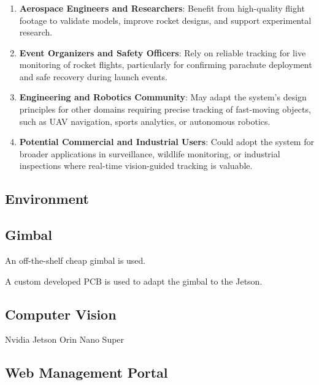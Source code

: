 \documentclass{article}
\begin{document}
\subsubsection*{\color{blue}{Indirect Stakeholders}}
\begin{enumerate}
    \item \textbf{Aerospace Engineers and Researchers}: Benefit from high-quality flight footage to validate models, improve rocket designs, and support experimental research.  

    \item \textbf{Event Organizers and Safety Officers}: Rely on reliable tracking for live monitoring of rocket flights, particularly for confirming parachute deployment and safe recovery during launch events.  

    \item \textbf{Engineering and Robotics Community}: May adapt the system’s design principles for other domains requiring precise tracking of fast-moving objects, such as UAV navigation, sports analytics, or autonomous robotics.  

    \item \textbf{Potential Commercial and Industrial Users}: Could adopt the system for broader applications in surveillance, wildlife monitoring, or industrial inspections where real-time vision-guided tracking is valuable.  
\end{enumerate}


\subsection{Environment}


\subsection{Gimbal}

An off-the-shelf cheap gimbal is used.

A custom developed PCB is used to adapt the gimbal to the Jetson.

\subsection{Computer Vision}

Nvidia Jetson Orin Nano Super

\subsection{Web Management Portal}
\end{document}
